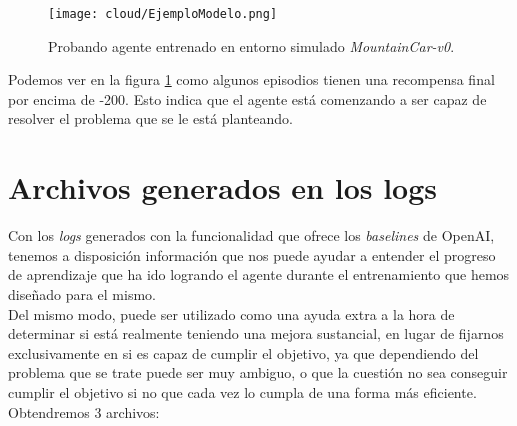 \documentclass[11pt,fleqn]{book} %
\begin{document}
\begin{figure}[H]
	\centering\texttt{[image: cloud/EjemploModelo.png]}
	\caption{Probando agente entrenado en entorno simulado \textit{MountainCar-v0}.}
	\label{fig:EjemploModelo} %
\end{figure}

Podemos ver en la figura \ref{fig:EjemploModelo} como algunos episodios tienen una recompensa final por encima de -200. Esto indica que el agente está comenzando a ser capaz de resolver el problema que se le está planteando.

\section{Archivos generados en los logs}\label{sec:logs}

Con los \textit{logs} generados con la funcionalidad que ofrece los \textit{baselines} de OpenAI, tenemos a disposición información que nos puede ayudar a entender el progreso de aprendizaje que ha ido logrando el agente durante el entrenamiento que hemos diseñado para el mismo. \\

Del mismo modo, puede ser utilizado como una ayuda extra a la hora de determinar si está realmente teniendo una mejora sustancial, en lugar de fijarnos exclusivamente en si es capaz de cumplir el objetivo, ya que dependiendo del problema que se trate puede ser muy ambiguo, o que la cuestión no sea conseguir cumplir el objetivo si no que cada vez lo cumpla de una forma más eficiente. \\

Obtendremos 3 archivos: \\
\end{document}
